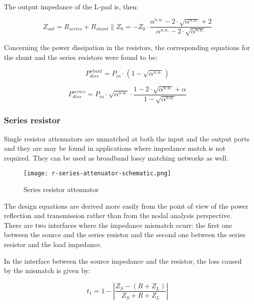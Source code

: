 \noindent The output impedance of the L-pad is, then:

\begin{equation}
    Z_{out} = R_{series} + R_{shunt} \parallel Z_0 = - Z_0 \cdot \frac{\alpha^{n.u.} - 2 \cdot \sqrt{\alpha^{n.u.}} + 2}{\alpha^{n.u.} - 2 \cdot \sqrt{\alpha^{n.u.}}}
\end{equation}

\noindent Concerning the power dissipation in the resistors, the corresponding equations for the shunt and the series resistors were found to be:

\begin{equation}
    P_{diss}^{shunt} = P_{in} \cdot \left( 1 - \sqrt{\alpha^{n.u.}}\right)
\end{equation}

\begin{equation}
    P_{diss}^{series} = P_{in} \cdot \sqrt{\alpha^{n.u.}} \cdot \frac{1 - 2 \cdot \sqrt{\alpha^{n.u.}} + \alpha}{1 - \sqrt{\alpha^{n.u.}}}
\end{equation}


\subsubsection{Series resistor}

\noindent Single resistor attenuators are unmatched at both the input and the output ports and they are may be found in applications where impedance match is not required. They can be used as broadband lossy matching networks as well.

\begin{figure}[ht]
    \centering
    \texttt{[image: r-series-attenuator-schematic.png]}
    \caption{Series resistor attenuator}
    \label{fig:r-series-attenuator-schematic}
\end{figure}

\noindent The design equations are derived more easily from the point of view of the power reflection and transmission rather than from the nodal analysis perspective. There are two interfaces where the impedance mismatch ocurr: the first one between the source and the series resistor and the second one between the series resistor and the load impedance.

\noindent In the interface between the source impedance and the resistor, the loss caused by the mismatch is given by:

\begin{equation}
    t_1 = 1 - \left| \frac{Z_S - (R + Z_L)}{Z_S + R + Z_L}\right|
\end{equation}

